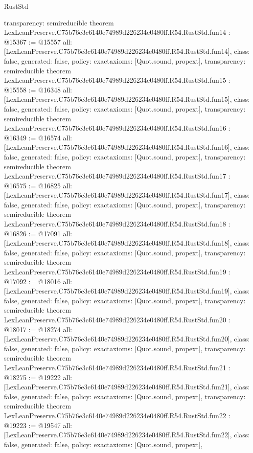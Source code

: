 \begin{lexlean}{RustStd}
\begin{coremodule}
{  transparency: semireducible
}
theorem LexLeanPreserve.C75b76e3c6140e74989d226234e0480ff.R54.RustStd.fun14 : @15367 := @15557 {
  all: [LexLeanPreserve.C75b76e3c6140e74989d226234e0480ff.R54.RustStd.fun14],
  class: false,
  generated: false,
  policy: exact{axioms: [Quot.sound, propext]},
  transparency: semireducible
}
theorem LexLeanPreserve.C75b76e3c6140e74989d226234e0480ff.R54.RustStd.fun15 : @15558 := @16348 {
  all: [LexLeanPreserve.C75b76e3c6140e74989d226234e0480ff.R54.RustStd.fun15],
  class: false,
  generated: false,
  policy: exact{axioms: [Quot.sound, propext]},
  transparency: semireducible
}
theorem LexLeanPreserve.C75b76e3c6140e74989d226234e0480ff.R54.RustStd.fun16 : @16349 := @16574 {
  all: [LexLeanPreserve.C75b76e3c6140e74989d226234e0480ff.R54.RustStd.fun16],
  class: false,
  generated: false,
  policy: exact{axioms: [Quot.sound, propext]},
  transparency: semireducible
}
theorem LexLeanPreserve.C75b76e3c6140e74989d226234e0480ff.R54.RustStd.fun17 : @16575 := @16825 {
  all: [LexLeanPreserve.C75b76e3c6140e74989d226234e0480ff.R54.RustStd.fun17],
  class: false,
  generated: false,
  policy: exact{axioms: [Quot.sound, propext]},
  transparency: semireducible
}
theorem LexLeanPreserve.C75b76e3c6140e74989d226234e0480ff.R54.RustStd.fun18 : @16826 := @17091 {
  all: [LexLeanPreserve.C75b76e3c6140e74989d226234e0480ff.R54.RustStd.fun18],
  class: false,
  generated: false,
  policy: exact{axioms: [Quot.sound, propext]},
  transparency: semireducible
}
theorem LexLeanPreserve.C75b76e3c6140e74989d226234e0480ff.R54.RustStd.fun19 : @17092 := @18016 {
  all: [LexLeanPreserve.C75b76e3c6140e74989d226234e0480ff.R54.RustStd.fun19],
  class: false,
  generated: false,
  policy: exact{axioms: [Quot.sound, propext]},
  transparency: semireducible
}
theorem LexLeanPreserve.C75b76e3c6140e74989d226234e0480ff.R54.RustStd.fun20 : @18017 := @18274 {
  all: [LexLeanPreserve.C75b76e3c6140e74989d226234e0480ff.R54.RustStd.fun20],
  class: false,
  generated: false,
  policy: exact{axioms: [Quot.sound, propext]},
  transparency: semireducible
}
theorem LexLeanPreserve.C75b76e3c6140e74989d226234e0480ff.R54.RustStd.fun21 : @18275 := @19222 {
  all: [LexLeanPreserve.C75b76e3c6140e74989d226234e0480ff.R54.RustStd.fun21],
  class: false,
  generated: false,
  policy: exact{axioms: [Quot.sound, propext]},
  transparency: semireducible
}
theorem LexLeanPreserve.C75b76e3c6140e74989d226234e0480ff.R54.RustStd.fun22 : @19223 := @19547 {
  all: [LexLeanPreserve.C75b76e3c6140e74989d226234e0480ff.R54.RustStd.fun22],
  class: false,
  generated: false,
  policy: exact{axioms: [Quot.sound, propext]},
}
\end{coremodule}
\end{lexlean}
